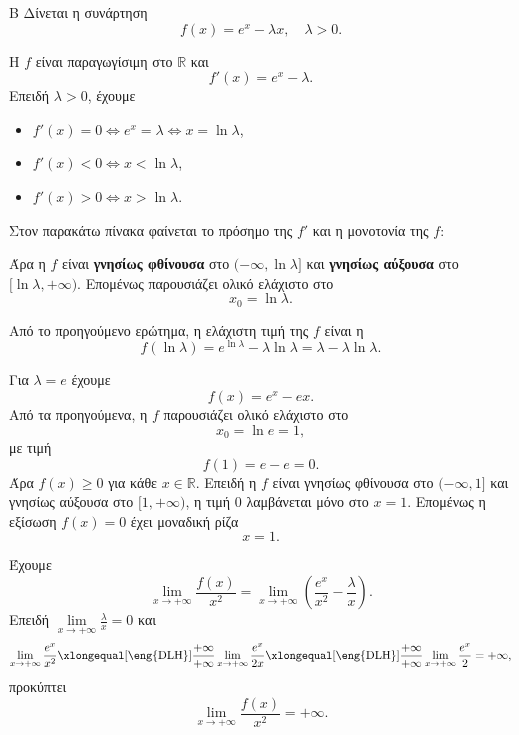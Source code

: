 \begin{thema}{Β}
Δίνεται η συνάρτηση
\[
f(x)=e^x-\lambda x,\quad \lambda>0.
\]

\begin{erwthma}
\item Η $f$ είναι παραγωγίσιμη στο $\mathbb{R}$ και
\[
f'(x)=e^x-\lambda.
\]
Επειδή $\lambda>0$, έχουμε
\begin{itemize}
\item $f'(x)=0\Leftrightarrow e^x=\lambda\Leftrightarrow x=\ln\lambda$,
\item $f'(x)<0\Leftrightarrow x<\ln\lambda$,
\item $f'(x)>0\Leftrightarrow x>\ln\lambda$.
\end{itemize}
Στον παρακάτω πίνακα φαίνεται το πρόσημο της $f'$ και η μονοτονία της $f$:
\begin{center}
\end{center}
Άρα η $f$ είναι \textbf{γνησίως φθίνουσα} στο $(-\infty,\ln\lambda]$ και \textbf{γνησίως αύξουσα} στο $[\ln\lambda,+\infty)$. Επομένως παρουσιάζει ολικό ελάχιστο στο
\[
x_0=\ln\lambda.
\]

\item Από το προηγούμενο ερώτημα, η ελάχιστη τιμή της $f$ είναι η
\[
f(\ln\lambda)=e^{\ln\lambda}-\lambda\ln\lambda
=\lambda-\lambda\ln\lambda.
\]

\item Για $\lambda=e$ έχουμε
\[
f(x)=e^x-ex.
\]
Από τα προηγούμενα, η $f$ παρουσιάζει ολικό ελάχιστο στο
\[
x_0=\ln e=1,
\]
με τιμή
\[
f(1)=e-e=0.
\]
Άρα $f(x)\geq0$ για κάθε $x\in\mathbb{R}$. Επειδή η $f$ είναι γνησίως φθίνουσα στο $(-\infty,1]$ και γνησίως αύξουσα στο $[1,+\infty)$, η τιμή $0$ λαμβάνεται μόνο στο $x=1$. Επομένως η εξίσωση $f(x)=0$ έχει μοναδική ρίζα
\[
x=1.
\]

\item Έχουμε
\[
\lim_{x\to+\infty}\frac{f(x)}{x^2}
=\lim_{x\to+\infty}\left(\frac{e^x}{x^2}-\frac{\lambda}{x}\right).
\]
Επειδή $\lim\limits_{x\to+\infty}\frac{\lambda}{x}=0$ και
\[
\lim_{x\to+\infty}\frac{e^x}{x^2}
\xlongequal[\text{\eng{DLH}}]{\frac{+\infty}{+\infty}}
\lim_{x\to+\infty}\frac{e^x}{2x}
\xlongequal[\text{\eng{DLH}}]{\frac{+\infty}{+\infty}}
\lim_{x\to+\infty}\frac{e^x}{2}=+\infty,
\]
προκύπτει
\[
\lim_{x\to+\infty}\frac{f(x)}{x^2}=+\infty.
\]
\end{erwthma}
\end{thema}
